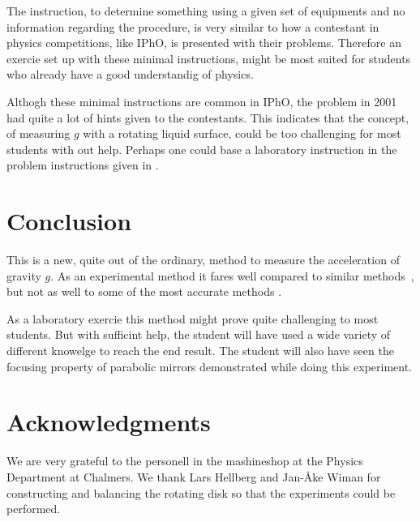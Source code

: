 \documentclass[11pt,towcolumn, swedish, english]{article}
\begin{document}
The instruction, to determine something using a given set of
equipments and no information regarding the procedure, is very similar
to how a contestant in physics competitions, like IPhO, is presented
with their problems. Therefore an exercie set up with these minimal
instructions, might be most suited for students who already have a
good understandig of physics. 

Althogh these minimal instructions are common in IPhO, the problem in
2001~\cite{IPhO2001} had quite a lot of hints given to the
contestants. This indicates that the concept, of measuring $g$ with a
rotating liquid surface, could be too challenging for most students
with out help. Perhaps one could base a laboratory instruction in the
problem instructions given in \cite{IPhO2001}. 



\section{Conclusion}
This is a new, quite out of the ordinary, method to measure the
acceleration of gravity $g$. As an experimental method it fares well
compared to similar methods~\cite{IPhO2001}, but not as well to some
of the most accurate methods \cite{Candela2001}. 

As a laboratory exercie this method might prove quite challenging to
most students. But with sufficint help, the student will have used a
wide variety of different knowelge to reach the end result. The
student will also have seen the focusing property of parabolic mirrors
demonstrated while doing this experiment.




\section*{Acknowledgments}
We are very grateful to the personell in the mashineshop at the
Physics Department at Chalmers. We thank Lars Hellberg and Jan-Åke
Wiman for constructing and balancing the rotating disk so that the
experiments could be performed. 





\end{document}
